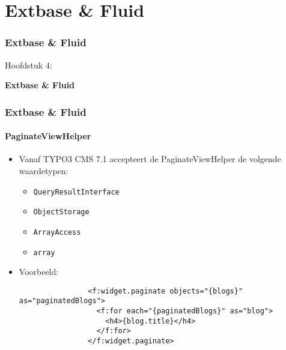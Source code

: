 %

\section{Extbase \& Fluid}
\begin{frame}[fragile]
	\frametitle{Extbase \& Fluid}

	\begin{center}\huge{Hoofdstuk 4:}\end{center}
	\begin{center}\huge{\color{typo3darkgrey}\textbf{Extbase \& Fluid}}\end{center}

\end{frame}


\begin{frame}[fragile]
	\frametitle{Extbase \& Fluid}
	\framesubtitle{PaginateViewHelper}

	\begin{itemize}

		\item Vanaf TYPO3 CMS 7.1 accepteert de PaginateViewHelper de volgende waardetypen:

			\begin{itemize}
				\item \texttt{QueryResultInterface}
				\item \texttt{ObjectStorage}
				\item \texttt{ArrayAccess}
				\item \texttt{array}
			\end{itemize}

		\item Voorbeeld:

			\begin{lstlisting}
				<f:widget.paginate objects="{blogs}" as="paginatedBlogs">
				  <f:for each="{paginatedBlogs}" as="blog">
				    <h4>{blog.title}</h4>
				  </f:for>
				</f:widget.paginate>
			\end{lstlisting}

	\end{itemize}

\end{frame}

